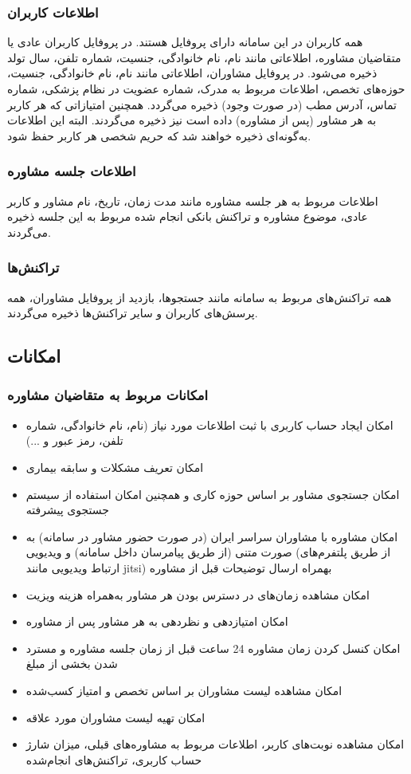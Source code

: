 \subsubsection{اطلاعات کاربران}
		همه کاربران در این سامانه دارای پروفایل هستند. در پروفایل کاربران عادی یا متقاضیان مشاوره، اطلاعاتی مانند نام، نام خانوادگی، جنسیت، شماره تلفن، سال تولد ذخیره می‌شود. در پروفایل مشاوران، اطلاعاتی مانند نام، نام خانوادگی، جنسیت، حوزه‌های تخصص، اطلاعات مربوط به مدرک، شماره عضویت در نظام پزشکی، شماره تماس، آدرس مطب (در صورت وجود) ذخیره می‌گردد.
همچنین امتیازاتی که هر کاربر به هر مشاور (پس از مشاوره) داده است نیز ذخیره می‌گردند. البته این اطلاعات به‌گونه‌ای ذخیره خواهند شد که حریم شخصی هر کاربر حفظ شود.

\subsubsection{اطلاعات جلسه مشاوره}
اطلاعات مربوط به هر جلسه مشاوره مانند مدت زمان، تاریخ، نام مشاور و کاربر عادی، موضوع مشاوره و تراکنش بانکی انجام شده مربوط به این جلسه ذخیره می‌گردند.

\subsubsection{تراکنش‌ها}
همه تراکنش‌های مربوط به سامانه مانند جستجوها، بازدید از پروفایل مشاوران، همه پرسش‌های کاربران و سایر تراکنش‌ها ذخیره می‌گردند.

\subsection{امکانات}
\subsubsection{امکانات مربوط به متقاضیان مشاوره}
\begin{itemize}
    \item امکان ایجاد حساب کاربری با ثبت اطلاعات مورد نیاز (نام، نام خانوادگی، شماره‌ تلفن، رمز عبور و ...)
	\item امکان تعریف مشکلات و سابقه بیماری
	\item امکان جستجوی مشاور بر اساس حوزه کاری و همچنین امکان استفاده از سیستم جستجوی پیشرفته
	\item امکان مشاوره با مشاوران سراسر ایران (در صورت حضور مشاور در سامانه) به صورت متنی (از طریق پیامرسان داخل سامانه) و ویدیویی (از طریق پلتفرم‌های ارتباط ویدیویی مانند jitsi) بهمراه ارسال توضیحات قبل از مشاوره
	\item امکان مشاهده زمان‌های در دسترس بودن هر مشاور به‌همراه هزینه ویزیت
	\item امکان امتیازدهی و نظردهی به هر مشاور پس از مشاوره
	\item امکان کنسل کردن زمان مشاوره 24 ساعت قبل از زمان جلسه مشاوره و مسترد شدن بخشی از مبلغ 
	\item امکان مشاهده لیست مشاوران بر اساس تخصص و امتیاز کسب‌شده
	\item امکان تهیه لیست مشاوران مورد علاقه 
    \item امکان مشاهده نوبت‌های کاربر، اطلاعات مربوط به مشاوره‌های قبلی، میزان شارژ حساب کاربری، تراکنش‌های انجام‌شده
\end{itemize}

